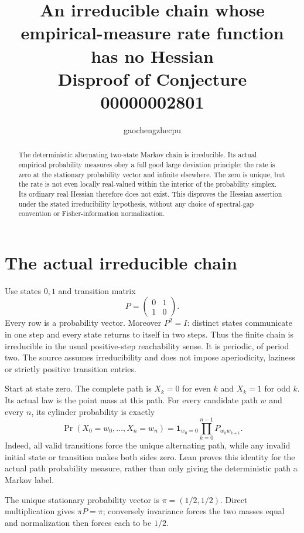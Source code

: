 \documentclass[11pt]{article}
\title{An irreducible chain whose empirical-measure\newline
rate function has no Hessian\\\large Disproof of Conjecture 00000002801}
\author{gaochengzhecpu}\date{}
\begin{document}
\maketitle
\begin{abstract}
The deterministic alternating two-state Markov chain is
irreducible. Its actual empirical probability measures obey
a full good large deviation principle: the rate is zero
at the stationary probability vector and infinite elsewhere.
The zero is unique, but the rate is not even locally
real-valued within the interior of the probability simplex.
Its ordinary real Hessian therefore does not exist.
This disproves the Hessian assertion under the stated
irreducibility hypothesis, without any choice of spectral-gap
convention or Fisher-information normalization.
\end{abstract}

\section*{The actual irreducible chain}
Use states $0,1$ and transition matrix
\[
                   P=\begin{pmatrix}0&1\\1&0\end{pmatrix}.
\]
Every row is a probability vector. Moreover $P^2=I$:
distinct states communicate in one step and every state
returns to itself in two steps. Thus the finite chain is
irreducible in the usual positive-step reachability sense.
It is periodic, of period two. The source assumes
irreducibility and does not impose aperiodicity, laziness
or strictly positive transition entries.

Start at state zero. The complete path is
$X_k=0$ for even $k$ and $X_k=1$ for odd $k$.
Its actual law is the point mass at this path. For every
candidate path $w$ and every $n$, its cylinder probability
is exactly
\[
 \Pr(X_0=w_0,\ldots,X_n=w_n)
   =\boldsymbol1_{w_0=0}
        \prod_{k=0}^{n-1}P_{w_k w_{k+1}}.
\]
Indeed, all valid transitions force the unique alternating
path, while any invalid initial state or transition makes
both sides zero. Lean proves this identity for the actual
path probability measure, rather than only giving the
deterministic path a Markov label.

The unique stationary probability vector is
$\pi=(1/2,1/2)$. Direct multiplication gives $\pi P=\pi$;
conversely invariance forces the two masses equal and
normalization then forces each to be $1/2$.

\newpage
\end{document}
